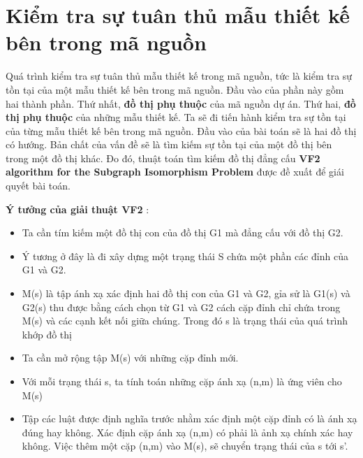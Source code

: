 \documentclass[12pt]{report}
\begin{document}
\section{Kiểm tra sự tuân thủ mẫu thiết kế bên trong mã nguồn}
Quá trình kiểm tra sự tuân thủ mẫu thiết kế trong mã nguồn, tức là kiểm tra sự tồn tại của một mẫu thiết kế bên trong mã nguồn. Đầu vào của phần này gồm hai thành phần. Thứ nhất, \textbf{đồ thị phụ thuộc} của mã nguồn dự án. Thứ hai, \textbf{đồ thị phụ thuộc} của những mẫu thiết kế. Ta sẽ đi tiến hành kiểm tra sự tồn tại của từng mẫu thiết kế bên trong mã nguồn. 
Đầu vào của bài toán sẽ là hai đồ thị có hướng. Bản chất của vấn đề sẽ là tìm kiếm sự tồn tại của một đồ thị bên trong một đồ thị khác. Đo đó, thuật toán tìm kiếm đồ thị đẳng cấu \textbf{VF2 algorithm for the Subgraph Isomorphism Problem} được đề xuất để giái quyết bài toán.


\noindent \textbf{Ý tưởng của giải thuật VF2} \cite{vf2}:
\begin{itemize}
	\item Ta cần tím kiếm một đồ thị con của đồ thị G1 mà đẳng cấu với đồ thị G2.
	\item  Ý tương ở đây là đi xây dựng một trạng thái S chứa một phần các đỉnh của G1 và G2.
	
	\item M(s) là tập ánh xạ xác định hai đồ thị con của G1 và G2, gỉa sử là G1(s) và G2(s) thu được bằng cách chọn từ G1 và G2 cách cặp đỉnh chỉ chứa trong M(s) và các cạnh kết nối giữa chúng. Trong đó s là trạng thái của quá trình khớp đồ thị
	\item Ta cần mở rộng tập M(s) với những cặp đỉnh mới.
	\item Với mỗi trạng thái s, ta tính toán những cặp ánh xạ (n,m) là ứng viên cho  M(s)
	\item Tập các luật được định nghĩa trước nhằm xác định một cặp đỉnh có là ánh xạ đúng hay không. Xác định cặp ánh xạ (n,m) có phải là ảnh xạ chính xác hay không. Việc thêm một cặp (n,m) vào M(s), sẽ chuyển trạng thái của s tới s'.
\end{itemize}
\pagebreak
\end{document}
